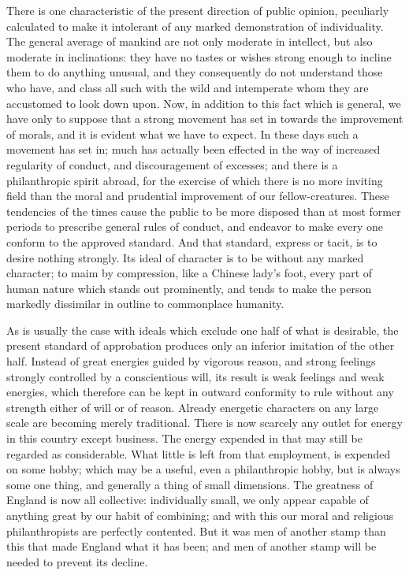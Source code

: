 \documentclass[12pt]{report}
\begin{document}
There is one characteristic of the present direction of public opinion, peculiarly calculated to make it intolerant of any marked demonstration of individuality. The general average of mankind are not only moderate in intellect, but also moderate in inclinations: they have no tastes or wishes strong enough to incline them to do anything unusual, and they consequently do not understand those who have, and class all such with the wild and intemperate whom they are accustomed to look down upon. Now, in addition to this fact which is general, we have only to suppose that a strong movement has set in towards the improvement of morals, and it is evident what we have to expect. In these days such a movement has set in; much has actually been effected in the way of increased regularity of conduct, and discouragement of excesses; and there is a philanthropic spirit abroad, for the exercise of which there is no more inviting field than the moral and prudential improvement of our fellow-creatures. These tendencies of the times cause the public to be more disposed than at most former periods to prescribe general rules of conduct, and endeavor to make every one conform to the approved standard. And that standard, express or tacit, is to desire nothing strongly. Its ideal of character is to be without any marked character; to maim by compression, like a Chinese lady's foot, every part of human nature which stands out prominently, and tends to make the person markedly dissimilar in outline to commonplace humanity.

As is usually the case with ideals which exclude one half of what is desirable, the present standard of approbation produces only an inferior imitation of the other half. Instead of great energies guided by vigorous reason, and strong feelings strongly controlled by a conscientious will, its result is weak feelings and weak energies, which therefore can be kept in outward conformity to rule without any strength either of will or of reason. Already energetic characters on any large scale are becoming merely traditional. There is now scarcely any outlet for energy in this country except business. The energy expended in that may still be regarded as considerable. What little is left from that employment, is expended on some hobby; which may be a useful, even a philanthropic hobby, but is always some one thing, and generally a thing of small dimensions. The greatness of England is now all collective: individually small, we only appear capable of anything great by our habit of combining; and with this our moral and religious philanthropists are perfectly contented. But it was men of another stamp than this that made England what it has been; and men of another stamp will be needed to prevent its decline.
\end{document}
